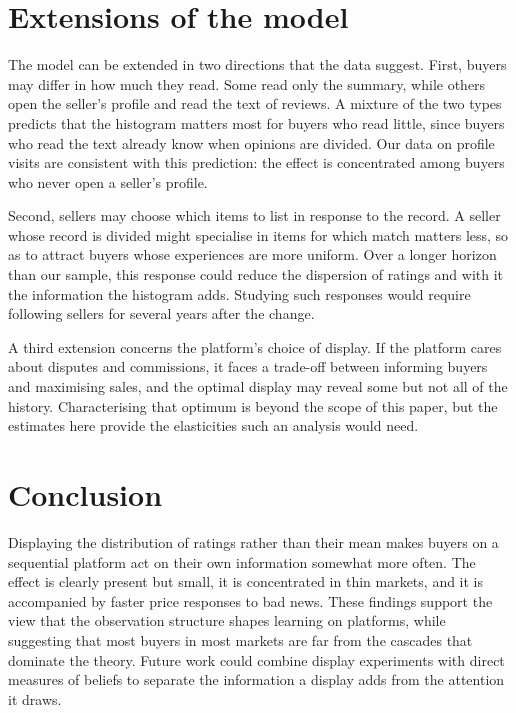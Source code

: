 \documentclass[12pt]{article}
\begin{document}
\section{Extensions of the model}
The model can be extended in two directions that the data suggest. First, buyers may differ in how much they read. Some read only the summary, while others open the seller's profile and read the text of reviews. A mixture of the two types predicts that the histogram matters most for buyers who read little, since buyers who read the text already know when opinions are divided. Our data on profile visits are consistent with this prediction: the effect is concentrated among buyers who never open a seller's profile.

Second, sellers may choose which items to list in response to the record. A seller whose record is divided might specialise in items for which match matters less, so as to attract buyers whose experiences are more uniform. Over a longer horizon than our sample, this response could reduce the dispersion of ratings and with it the information the histogram adds. Studying such responses would require following sellers for several years after the change.

A third extension concerns the platform's choice of display. If the platform cares about disputes and commissions, it faces a trade-off between informing buyers and maximising sales, and the optimal display may reveal some but not all of the history. Characterising that optimum is beyond the scope of this paper, but the estimates here provide the elasticities such an analysis would need.

\section{Conclusion}
Displaying the distribution of ratings rather than their mean makes buyers on a sequential platform act on their own information somewhat more often. The effect is clearly present but small, it is concentrated in thin markets, and it is accompanied by faster price responses to bad news. These findings support the view that the observation structure shapes learning on platforms, while suggesting that most buyers in most markets are far from the cascades that dominate the theory. Future work could combine display experiments with direct measures of beliefs to separate the information a display adds from the attention it draws.
\end{document}
